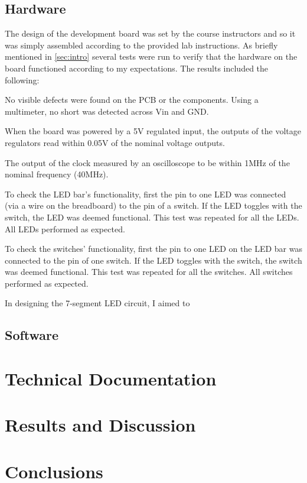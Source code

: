\documentclass[11pt]{article}
\begin{document}
\subsection{Hardware}

The design of the development board was set by the course instructors and so it was simply assembled according to the provided lab instructions. As briefly mentioned in \ref{sec:intro} several tests were run to verify that the hardware on the board functioned according to my expectations. The results included the following:

	\begin{description} \itemsep0pt
		\item[Pre-assembly Inspection ] No visible defects were found on the PCB or the components. Using a multimeter, no short was detected across Vin and GND.
		\item[Power Supply ] When the board was powered by a 5V regulated input, the outputs of the voltage regulators read within 0.05V of the nominal voltage outputs. 
		\item[Clock ] The output of the clock measured by an oscilloscope to be within 1MHz of the nominal frequency (40MHz).
		\item[LED bar ] To check the LED bar's functionality, first the pin to one LED was connected (via a wire on the breadboard) to the pin of a switch. If the LED toggles with the switch, the LED was deemed functional. This test was repeated for all the LEDs. All LEDs performed as expected.
		\item[Switches ] To check the switches' functionality, first the pin to one LED on the LED bar was connected to the pin of one switch. If the LED toggles with the switch, the switch was deemed functional. This test was repeated for all the switches. All switches performed as expected.
		
		
	\end{description}


In designing the 7-segment LED circuit, I aimed to 
	

\subsection{Software}



\section{Technical Documentation}


\section{Results and Discussion}


\section{Conclusions}
\end{document}
